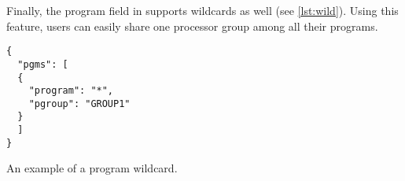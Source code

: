 Finally, the program field in  supports wildcards as well (see \cref{lst:wild}). Using this feature, users can easily share one processor group among all their programs.

\begin{listing}
	\begin{verbatim}
{
  "pgms": [
  {
    "program": "*",
    "pgroup": "GROUP1"  
  }
  ]
}
	\end{verbatim}
	\caption{An example of a program wildcard.}
	\label{lst:wild}
\end{listing}
